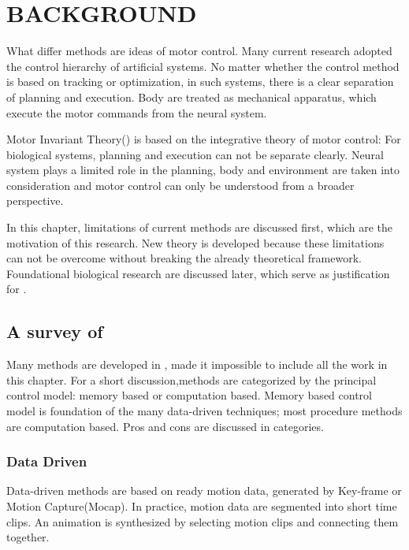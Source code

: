 \chapter{BACKGROUND}
\label{chap:background}

What differ \cms methods are ideas of motor control.
Many current \cms research adopted the control hierarchy of artificial systems.
No matter whether the control method is based on tracking or optimization, in such systems, there is a clear separation of planning and execution.
Body are treated as mechanical apparatus, which execute the motor commands from the neural system.

Motor Invariant Theory(\moit) is based on the integrative theory of motor control\citep{dickinson2000animals}:
For biological systems, planning and execution can not be separate clearly.
Neural system plays a limited role in the planning, body and environment are taken into consideration and motor control can only be understood from a broader perspective.

In this chapter, limitations of current \cms methods are discussed first, which are the motivation of this research.
New theory is developed because these limitations can not be overcome without breaking the already theoretical framework.
Foundational biological research are discussed later,  which serve as justification for \moit.



\section{A survey of \cms}

Many methods are developed in \cms, made it impossible to include all the work in this chapter.
For a short discussion,\cms methods are categorized by the principal control model: memory based or computation based.
Memory based control model is foundation of the  many data-driven techniques;
most procedure methods are computation based.
Pros and cons are discussed in categories.

\subsection{Data Driven}
Data-driven methods are based on ready motion data,  generated by Key-frame or Motion Capture(Mocap). 
In practice, motion data are segmented into short time clips. 
An animation is synthesized by selecting motion clips and connecting them together\citep{Parent2002,kovar2003flexible}.

